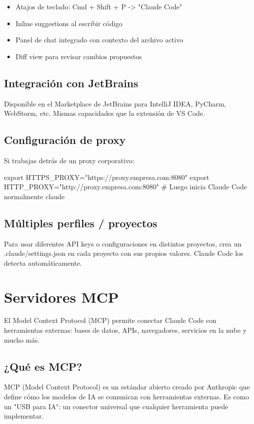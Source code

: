 \documentclass[11pt,a4paper]{book}
\begin{document}
\begin{itemize}\item Atajos de teclado: Cmd + Shift + P -> "Claude Code"\end{itemize}
\begin{itemize}\item Inline suggestions al escribir código\end{itemize}
\begin{itemize}\item Panel de chat integrado con contexto del archivo activo\end{itemize}
\begin{itemize}\item Diff view para revisar cambios propuestos\end{itemize}
\section{Integración con JetBrains}
Disponible en el Marketplace de JetBrains para IntelliJ IDEA, PyCharm, WebStorm, etc. Mismas capacidades que la extensión de VS Code.

\section{Configuración de proxy}
Si trabajas detrás de un proxy corporativo:

\begin{codebox}
export HTTPS_PROXY="https://proxy.empresa.com:8080"
export HTTP_PROXY="http://proxy.empresa.com:8080"
# Luego inicia Claude Code normalmente
claude
\end{codebox}
\section{Múltiples perfiles / proyectos}
Para usar diferentes API keys o configuraciones en distintos proyectos, crea un .claude/settings.json en cada proyecto con sus propios valores. Claude Code los detecta automáticamente.

\chapter{Servidores MCP}
El Model Context Protocol (MCP) permite conectar Claude Code con herramientas externas: bases de datos, APIs, navegadores, servicios en la nube y mucho más.

\section{¿Qué es MCP?}
MCP (Model Context Protocol) es un estándar abierto creado por Anthropic que define cómo los modelos de IA se comunican con herramientas externas. Es como un "USB para IA": un conector universal que cualquier herramienta puede implementar.
\end{document}
